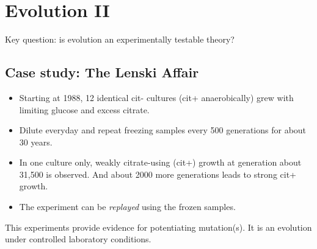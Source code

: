 \chapter{Evolution II}

Key question: is evolution an experimentally testable theory?
\section{Case study: The Lenski Affair}

\begin{itemize}
    \item Starting at 1988, 12 identical cit- cultures (cit+ anaerobically) grew with limiting glucose and excess citrate.
    \item Dilute everyday and repeat freezing samples every 500 generations for about 30 years.
    \item In one culture only, weakly citrate-using (cit+) growth at generation about 31,500 is observed. And about 2000 more generations leads to strong cit+ growth.
    \item The experiment can be \textit{replayed} using the frozen samples.
\end{itemize}
This experiments provide evidence for potentiating mutation(s). It is an evolution under controlled laboratory conditions.

